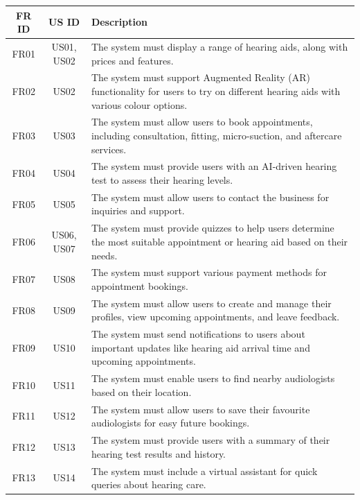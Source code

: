 \documentclass{article}
\begin{document}
\begin{table}[h]
    \centering
    \begin{tabularx}{\textwidth}{|c|c|X|}
        \hline
        \textbf{FR ID} & \textbf{US ID} & \textbf{Description} \\
        \hline
        FR01 & US01, US02 & The system must display a range of hearing aids, along with prices and features. \\
        \hline
        FR02 & US02 & The system must support Augmented Reality (AR) functionality for users to try on different hearing aids with various colour options. \\
        \hline
        FR03 & US03 & The system must allow users to book appointments, including consultation, fitting, micro-suction, and aftercare services. \\
        \hline
        FR04 & US04 & The system must provide users with an AI-driven hearing test to assess their hearing levels. \\
        \hline
        FR05 & US05 & The system must allow users to contact the business for inquiries and support. \\
        \hline
        FR06 & US06, US07 & The system must provide quizzes to help users determine the most suitable appointment or hearing aid based on their needs. \\
        \hline
        FR07 & US08 & The system must support various payment methods for appointment bookings. \\
        \hline
        FR08 & US09 & The system must allow users to create and manage their profiles, view upcoming appointments, and leave feedback. \\
        \hline
        FR09 & US10 & The system must send notifications to users about important updates like hearing aid arrival time and upcoming appointments. \\
        \hline
        FR10 & US11 & The system must enable users to find nearby audiologists based on their location. \\
        \hline
        FR11 & US12 & The system must allow users to save their favourite audiologists for easy future bookings. \\
        \hline
        FR12 & US13 & The system must provide users with a summary of their hearing test results and history. \\
        \hline
        FR13 & US14 & The system must include a virtual assistant for quick queries about hearing care. \\

\end{tabularx}
\end{table}
\end{document}
